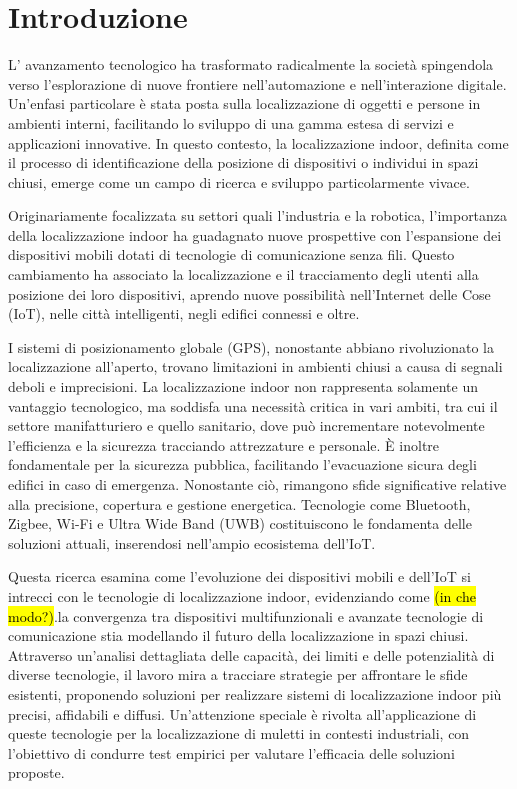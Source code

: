 \chapter{Introduzione}
\lettrine[lines=2]{L}{'} avanzamento tecnologico ha trasformato radicalmente la società spingendola verso l'esplorazione di nuove frontiere nell'automazione e nell'interazione digitale. Un'enfasi particolare è stata posta sulla localizzazione di oggetti e persone in ambienti interni, facilitando lo sviluppo di una gamma estesa di servizi e applicazioni innovative. In questo contesto, la localizzazione indoor, definita come il processo di identificazione della posizione di dispositivi o individui in spazi chiusi, emerge come un campo di ricerca e sviluppo particolarmente vivace. 

Originariamente focalizzata su settori quali l'industria e la robotica, l'importanza della localizzazione indoor ha guadagnato nuove prospettive con l'espansione dei dispositivi mobili dotati di tecnologie di comunicazione senza fili. Questo cambiamento ha associato la localizzazione e il tracciamento degli utenti alla posizione dei loro dispositivi, aprendo nuove possibilità nell'Internet delle Cose (IoT), nelle città intelligenti, negli edifici connessi e oltre.

I sistemi di posizionamento globale (GPS), nonostante abbiano rivoluzionato la localizzazione all'aperto, trovano limitazioni in ambienti chiusi a causa di segnali deboli e imprecisioni\cite{bisio_pervasive_2011}. La localizzazione indoor non rappresenta solamente un vantaggio tecnologico, ma soddisfa una necessità critica in vari ambiti, tra cui il settore manifatturiero e quello sanitario, dove può incrementare notevolmente l'efficienza e la sicurezza tracciando attrezzature e personale. È inoltre fondamentale per la sicurezza pubblica, facilitando l'evacuazione sicura degli edifici in caso di emergenza\cite{bisio_wifi_barometer_2018}. Nonostante ciò, rimangono sfide significative relative alla precisione, copertura e gestione energetica. Tecnologie come Bluetooth, Zigbee, Wi-Fi e Ultra Wide Band (UWB) costituiscono le fondamenta delle soluzioni attuali, inserendosi nell'ampio ecosistema dell'IoT.

\noindent Questa ricerca esamina come l'evoluzione dei dispositivi mobili e dell'IoT si intrecci con le tecnologie di localizzazione indoor, evidenziando come \hl{(in che modo?)}.la convergenza tra dispositivi multifunzionali e avanzate tecnologie di comunicazione stia modellando il futuro della localizzazione in spazi chiusi. Attraverso un'analisi dettagliata delle capacità, dei limiti e delle potenzialità di diverse tecnologie, il lavoro mira a tracciare strategie per affrontare le sfide esistenti, proponendo soluzioni per realizzare sistemi di localizzazione indoor più precisi, affidabili e diffusi. Un'attenzione speciale è rivolta all'applicazione di queste tecnologie per la localizzazione di muletti in contesti industriali, con l'obiettivo di condurre test empirici per valutare l'efficacia delle soluzioni proposte.


